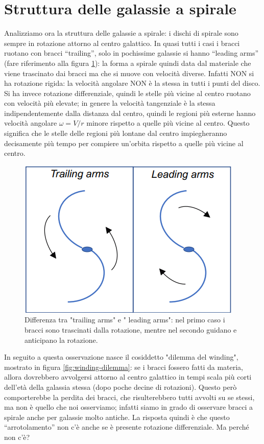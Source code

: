 \section{Struttura delle galassie a spirale}
Analizziamo ora la struttura delle galassie a spirale: i dischi di spirale sono sempre in rotazione attorno al centro galattico. In quasi tutti i casi i bracci ruotano con bracci “trailing”, solo in pochissime galassie si hanno “leading arms” (fare riferimento alla figura \ref{fig:trailing-leading arms}): la forma a spirale quindi data dal materiale che viene trascinato dai bracci ma che si muove con velocità diverse. Infatti NON si ha rotazione rigida: la velocità angolare NON è la stessa in tutti i punti del disco. Si ha invece rotazione differenziale, quindi le stelle più vicine al centro ruotano con velocità più elevate; in genere la velocità tangenziale è la stessa indipendentemente dalla distanza dal centro, quindi le regioni più esterne hanno velocità angolare $\omega = V/r$ minore rispetto a quelle più vicine al centro. Questo significa che le stelle delle regioni più lontane dal centro impiegheranno decisamente più tempo per compiere un'orbita rispetto a quelle più vicine al centro.

\begin{figure}
    \centering
    \includegraphics{immagini/trailing-leading-arms.png}
    \caption[width = 0.5 \textwidth]{Differenza tra "trailing arms" e " leading arms": nel primo caso i bracci sono trascinati dalla rotazione, mentre nel secondo guidano e anticipano la rotazione.}
    \label{fig:trailing-leading arms}
\end{figure}

In seguito a questa osservazione nasce il cosiddetto "dilemma del winding", mostrato in figura \ref{fig:winding-dilemma}: se i bracci fossero fatti da materia, allora dovrebbero avvolgersi attorno al centro galattico in tempi scala più corti dell’età della galassia stessa (dopo poche decine di rotazioni). Questo però comporterebbe la perdita dei bracci, che risulterebbero tutti avvolti su se stessi, ma non è quello che noi osserviamo; infatti siamo in grado di osservare bracci a spirale anche per galassie molto antiche. La risposta quindi è che questo “arrotolamento” non c’è anche se è presente rotazione differenziale. Ma perché non c'è?

